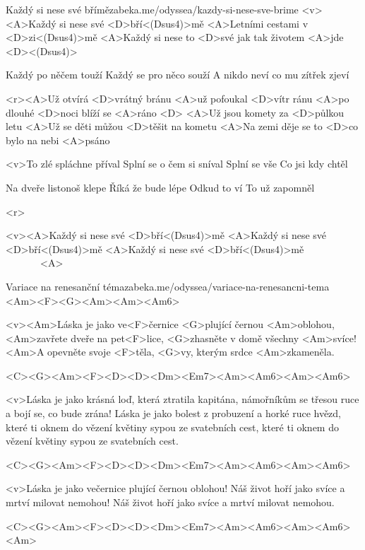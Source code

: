 \begin{song}{29}{Každý si nese své břímě}{zabeka.me/odyssea/kazdy-si-nese-sve-brime}
	<v><A>Každý si nese své <D>bří<(Dsus4)>mě
	<A>Letními cestami v <D>zi<(Dsus4)>mě
	<A>Každý si nese to <D>své
	jak tak životem <A>jde <D><(Dsus4)>

	Každý po něčem touží
	Každý se pro něco souží
	A nikdo neví
	co mu zítřek zjeví

	<r><A>Už otvírá <D>vrátný bránu
	<A>už pofoukal <D>vítr ránu
	<A>po dlouhé <D>noci blíží se <A>ráno <D>
	<A>Už jsou komety za <D>půlkou letu
	<A>Už se děti můžou <D>těšit na kometu
	<A>Na zemi děje se to <D>co bylo na nebi <A>psáno

	<v>To zlé spláchne příval
	Splní se o čem si sníval
	Splní se vše
	Co jsi kdy chtěl

	Na dveře listonoš klepe
	Říká že bude lépe
	Odkud to ví
	To už zapomněl

	<r>

	<v><A>Každý si nese své <D>bří<(Dsus4)>mě
	<A>Každý si nese své <D>bří<(Dsus4)>mě
	<A>Každý si nese své <D>bří<(Dsus4)>mě \ \ \ \ \ \ \ <A>
\end{song}
\begin{song}{30}{Variace na renesanční téma}{zabeka.me/odyssea/variace-na-renesancni-tema}
	<Am><F><G><Am><Am><Am6>

	<v><Am>Láska je jako ve<F>černice <G>plující černou <Am>oblohou,
	<Am>zavřete dveře na pet<F>lice, <G>zhasněte v domě všechny <Am>svíce!
	<Am>A opevněte svoje <F>těla, <G>vy, kterým srdce <Am>zkameněla.

	<C><G><Am><F><D><D><Dm><Em7><Am><Am6><Am><Am6>

	<v>Láska je jako krásná loď, která ztratila kapitána,
	námořníkům se třesou ruce a bojí se, co bude zrána!
	Láska je jako bolest z probuzení a horké ruce hvězd,
	které ti oknem do vězení květiny sypou ze svatebních cest,
	které ti oknem do vězení květiny sypou ze svatebních cest.

	<C><G><Am><F><D><D><Dm><Em7><Am><Am6><Am><Am6>

	<v>Láska je jako večernice plující černou oblohou!
	Náš život hoří jako svíce a mrtví milovat nemohou!
	Náš život hoří jako svíce a mrtví milovat nemohou.

	<C><G><Am><F><D><D><Dm><Em7><Am><Am6><Am><Am6><Am>

\end{song}

